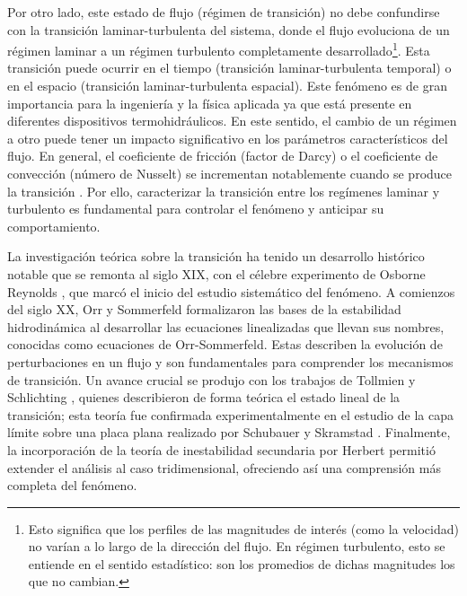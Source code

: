 Por otro lado, este estado de flujo (régimen de transición) no debe confundirse con la transición laminar-turbulenta del sistema, donde el flujo evoluciona de un régimen laminar a un régimen turbulento completamente desarrollado\footnote{Esto significa que los perfiles de las magnitudes de interés (como la velocidad) no varían a lo largo de la dirección del flujo. En régimen turbulento, esto se entiende en el sentido estadístico: son los promedios de dichas magnitudes los que no cambian.}. Esta transición puede ocurrir en el tiempo (transición laminar-turbulenta temporal) o en el espacio (transición laminar-turbulenta espacial). Este fenómeno es de gran importancia para la ingeniería y la física aplicada ya que está presente en diferentes dispositivos termohidráulicos. En este sentido, el cambio de un régimen a otro puede tener un impacto significativo en los parámetros característicos del flujo. En general, el coeficiente de fricción (factor de Darcy) o el coeficiente de convección (número de Nusselt) se incrementan notablemente cuando se produce la transición \cite{incropera,white}. Por ello, caracterizar la transición entre los regímenes laminar y turbulento es fundamental para controlar el fenómeno y anticipar su comportamiento. 

La investigación teórica sobre la transición ha tenido un desarrollo histórico notable que se remonta al siglo XIX, con el célebre experimento de Osborne Reynolds \cite{reynolds1883}, que marcó el inicio del estudio sistemático del fenómeno. A comienzos del siglo XX, Orr \cite{orr1907} y Sommerfeld \cite{sommerfeld1908} formalizaron las bases de la estabilidad hidrodinámica al desarrollar las ecuaciones linealizadas que llevan sus nombres, conocidas como ecuaciones de Orr-Sommerfeld. Estas describen la evolución de perturbaciones en un flujo y son fundamentales para comprender los mecanismos de transición. Un avance crucial se produjo con los trabajos de Tollmien \cite{tollmien1930} y Schlichting \cite{schlichting1933}, quienes describieron de forma teórica el estado lineal de la transición; esta teoría fue confirmada experimentalmente en el estudio de la capa límite sobre una placa plana realizado por Schubauer y Skramstad \cite{schubauer1947laminar}. Finalmente, la incorporación de la teoría de inestabilidad secundaria por Herbert \cite{herbert1983secondary} permitió extender el análisis al caso tridimensional, ofreciendo así una comprensión más completa del fenómeno. 

